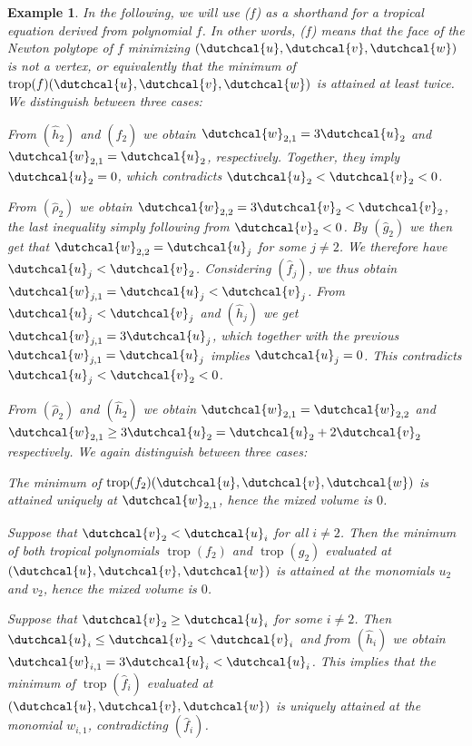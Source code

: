 \documentclass[12pt,reqno,a4paper]{amsart}
\newcommand{\dcu}{\dutchcal{u}}
\newcommand{\dcv}{\dutchcal{v}}
\newcommand{\dcw}{\dutchcal{w}}
\theoremstyle{theoremstyle}
\theoremstyle{examplestyle}
\newtheorem{example}[theorem]{Example}
\theoremstyle{algorithmstyle}
\DeclareMathOperator{\trop}{trop}
\begin{document}
\begin{example}
    In the following, %
    we will use ($f$) as a shorthand for a tropical equation derived from polynomial $f$. In other words, ($f$) means that the face of the Newton polytope of $f$ minimizing $(\dutchcal{u},\dutchcal{v},\dutchcal{w})$ is not a vertex, or equivalently that the minimum of $\trop(f)(\dutchcal{u},\dutchcal{v},\dutchcal{w})$ is attained at least twice.
  We distinguish between three cases:
  \begin{description}[leftmargin=5mm]
  \item[$\dutchcal{u}_2<\dutchcal{v}_2$] From $(\hat h_2)$ and $(\hat f_2)$ we obtain $\dcw_{2,1}=3\dcu_{2}$ and $\dcw_{2,1}=\dcu_2$, respectively. Together, they imply $\dcu_2=0$, which contradicts $\dcu_2<\dcv_2<0$.
  \item[$\dutchcal{u}_2>\dutchcal{v}_2$] From $(\hat \rho_2)$ we obtain $\dcw_{2,2}=3\dcv_2<\dcv_2$, the last inequality simply following from $\dcv_2<0$. By $(\hat g_2)$ we then get that $\dcw_{2,2}=\dcu_{j}$ for some $j\neq 2$. We therefore have $\dcu_{j}<\dcv_2$. Considering $(\hat f_j)$, we thus obtain $\dcw_{j,1}=\dcu_j<\dcv_j$. From $\dcu_j<\dcv_j$ and $(\hat h_j)$ we get $\dcw_{j,1}=3\dcu_j$, which together with the previous $\dcw_{j,1}=\dcu_j$ implies $\dcu_j=0$. This contradicts $\dcu_j<\dcv_2<0$.
  \item[$\dutchcal{u}_2=\dutchcal{v}_2$] From $(\hat \rho_2)$ and $(\hat h_2)$ we obtain $\dcw_{2,1}=\dcw_{2,2}$ and $\dcw_{2,1}\geq 3\dcu_2=\dcu_2+2\dcv_2$ respectively. We again distinguish between three cases:
    \begin{description}[leftmargin=3mm]
    \item[$\dcu_2=\dcv_2>\dcw_{2,1}=\dcw_{2,2}$] The minimum of $\trop(f_2)(\dutchcal{u},\dutchcal{v},\dutchcal{w})$ is attained uniquely at $\dcw_{2,1}$, hence the mixed volume is $0$.
    \item[$\dcu_2=\dcv_2<\dcw_{2,1}=\dcw_{2,2}$] Suppose that $\dcv_2<\dcu_i$ for all $i\neq 2$. Then %
      the minimum of both tropical polynomials $\trop(f_2)$ and $\trop(g_2)$ evaluated at $(\dutchcal{u},\dutchcal{v},\dutchcal{w})$ is attained at the monomials $u_2$ and $v_2$, hence the mixed volume is $0$.

      Suppose that $\dcv_2\geq\dcu_i$ for some $i\neq 2$. Then $\dcu_i\leq \dcv_2<\dcv_i$ and from $(\hat h_i)$ we obtain $\dcw_{i,1}=3\dcu_{i}<\dcu_{i}$. This implies that the minimum of $\trop(\hat f_i)$ evaluated at $(\dutchcal{u},\dutchcal{v},\dutchcal{w})$ is uniquely attained at the monomial $w_{i,1}$, contradicting $(\hat f_i)$.


\end{description}
\end{description}
\end{example}
\end{document}
